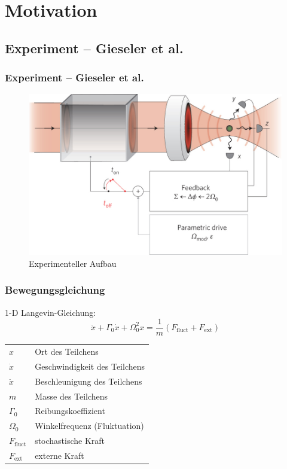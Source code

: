 \documentclass{beamer}
\begin{document}
\section{Motivation}
\subsection{Experiment -- Gieseler et al.}
\begin{frame}
\frametitle{Experiment -- Gieseler et al.}
\begin{center}
\begin{figure}
\includegraphics[scale=0.3]{../images/experimental_setup.jpg}
\caption{Experimenteller Aufbau \cite{Gieseler2014}}
\end{figure}
\end{center}
\end{frame}

\begin{frame}
\frametitle{Bewegungsgleichung}
1-D Langevin-Gleichung:
\begin{equation}
    \label{eq:langevin}
    \ddot{x} + \Gamma_0 \dot{x} + \Omega^2_0x = \frac 1 m \left(F_\text{fluct} + F_\text{ext}\right)
\end{equation}
\begin{tabular}{l l}
$x$ & Ort des Teilchens\\
$\dot{x}$ & Geschwindigkeit des Teilchens\\
$\ddot{x}$ & Beschleunigung des Teilchens\\
$m$ & Masse des Teilchens\\
$\Gamma_0$ & Reibungskoeffizient\\
$\Omega_0$ & Winkelfrequenz (Fluktuation)\\
$F_\text{fluct}$ & stochastische Kraft\\
$F_\text{ext}$ & externe Kraft
\end{tabular}
\end{frame}
\end{document}
